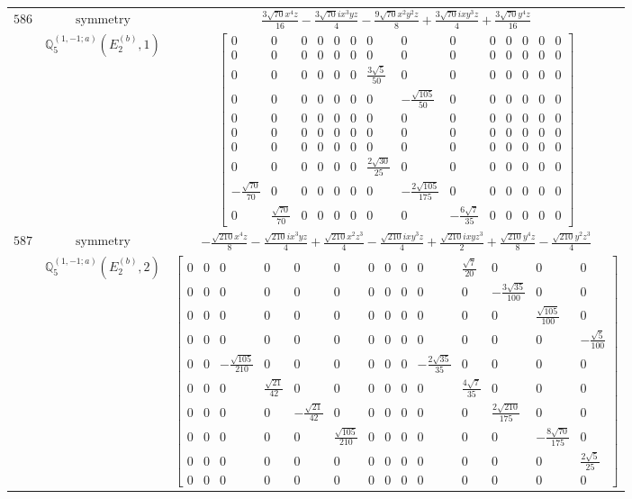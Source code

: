 \documentclass[fleqn,8pt,landscape]{jsarticle}
\begin{document}
\begin{longtable}{ccc}
$ 586 $ & $ \text{symmetry} $ & $ \frac{3 \sqrt{70} x^{4} z}{16} - \frac{3 \sqrt{70} i x^{3} y z}{4} - \frac{9 \sqrt{70} x^{2} y^{2} z}{8} + \frac{3 \sqrt{70} i x y^{3} z}{4} + \frac{3 \sqrt{70} y^{4} z}{16} $ \\
$  $ & $ \mathbb{Q}_{5}^{(1,-1;a)}(E_{2}^{(b)},1) $ & $ \begin{bmatrix} 0 & 0 & 0 & 0 & 0 & 0 & 0 & 0 & 0 & 0 & 0 & 0 & 0 & 0 \\ 0 & 0 & 0 & 0 & 0 & 0 & 0 & 0 & 0 & 0 & 0 & 0 & 0 & 0 \\ 0 & 0 & 0 & 0 & 0 & 0 & \frac{3 \sqrt{5}}{50} & 0 & 0 & 0 & 0 & 0 & 0 & 0 \\ 0 & 0 & 0 & 0 & 0 & 0 & 0 & - \frac{\sqrt{105}}{50} & 0 & 0 & 0 & 0 & 0 & 0 \\ 0 & 0 & 0 & 0 & 0 & 0 & 0 & 0 & 0 & 0 & 0 & 0 & 0 & 0 \\ 0 & 0 & 0 & 0 & 0 & 0 & 0 & 0 & 0 & 0 & 0 & 0 & 0 & 0 \\ 0 & 0 & 0 & 0 & 0 & 0 & 0 & 0 & 0 & 0 & 0 & 0 & 0 & 0 \\ 0 & 0 & 0 & 0 & 0 & 0 & \frac{2 \sqrt{30}}{25} & 0 & 0 & 0 & 0 & 0 & 0 & 0 \\ - \frac{\sqrt{70}}{70} & 0 & 0 & 0 & 0 & 0 & 0 & - \frac{2 \sqrt{105}}{175} & 0 & 0 & 0 & 0 & 0 & 0 \\ 0 & \frac{\sqrt{70}}{70} & 0 & 0 & 0 & 0 & 0 & 0 & - \frac{6 \sqrt{7}}{35} & 0 & 0 & 0 & 0 & 0 \end{bmatrix} $ \\ \hline
$ 587 $ & $ \text{symmetry} $ & $ - \frac{\sqrt{210} x^{4} z}{8} - \frac{\sqrt{210} i x^{3} y z}{4} + \frac{\sqrt{210} x^{2} z^{3}}{4} - \frac{\sqrt{210} i x y^{3} z}{4} + \frac{\sqrt{210} i x y z^{3}}{2} + \frac{\sqrt{210} y^{4} z}{8} - \frac{\sqrt{210} y^{2} z^{3}}{4} $ \\
$  $ & $ \mathbb{Q}_{5}^{(1,-1;a)}(E_{2}^{(b)},2) $ & $ \begin{bmatrix} 0 & 0 & 0 & 0 & 0 & 0 & 0 & 0 & 0 & 0 & \frac{\sqrt{7}}{20} & 0 & 0 & 0 \\ 0 & 0 & 0 & 0 & 0 & 0 & 0 & 0 & 0 & 0 & 0 & - \frac{3 \sqrt{35}}{100} & 0 & 0 \\ 0 & 0 & 0 & 0 & 0 & 0 & 0 & 0 & 0 & 0 & 0 & 0 & \frac{\sqrt{105}}{100} & 0 \\ 0 & 0 & 0 & 0 & 0 & 0 & 0 & 0 & 0 & 0 & 0 & 0 & 0 & - \frac{\sqrt{5}}{100} \\ 0 & 0 & - \frac{\sqrt{105}}{210} & 0 & 0 & 0 & 0 & 0 & 0 & - \frac{2 \sqrt{35}}{35} & 0 & 0 & 0 & 0 \\ 0 & 0 & 0 & \frac{\sqrt{21}}{42} & 0 & 0 & 0 & 0 & 0 & 0 & \frac{4 \sqrt{7}}{35} & 0 & 0 & 0 \\ 0 & 0 & 0 & 0 & - \frac{\sqrt{21}}{42} & 0 & 0 & 0 & 0 & 0 & 0 & \frac{2 \sqrt{210}}{175} & 0 & 0 \\ 0 & 0 & 0 & 0 & 0 & \frac{\sqrt{105}}{210} & 0 & 0 & 0 & 0 & 0 & 0 & - \frac{8 \sqrt{70}}{175} & 0 \\ 0 & 0 & 0 & 0 & 0 & 0 & 0 & 0 & 0 & 0 & 0 & 0 & 0 & \frac{2 \sqrt{5}}{25} \\ 0 & 0 & 0 & 0 & 0 & 0 & 0 & 0 & 0 & 0 & 0 & 0 & 0 & 0 \end{bmatrix} $ \\ \hline

\end{longtable}
\end{document}

